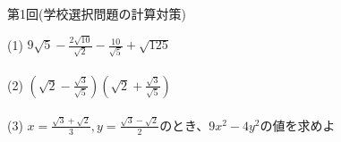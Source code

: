 \documentclass{jarticle}
\begin{document}
\begin{center}
第1回(学校選択問題の計算対策)
\end{center}
(1) $9\sqrt 5-\frac{2\sqrt{10}}{\sqrt 2}-\frac{10}{\sqrt 5}+\sqrt{125}$\\
\\
(2) $(\sqrt{2}-\frac{\sqrt{3}}{\sqrt{5}})(\sqrt{2}+\frac{\sqrt{3}}{\sqrt{5}})$\\
\\
(3) $x=\frac{\sqrt{3}+\sqrt{2}}{3},y=\frac{\sqrt{3}-\sqrt{2}}{2}$のとき、$9x^{2}-4y^{2}$の値を求めよ
\end{document}
